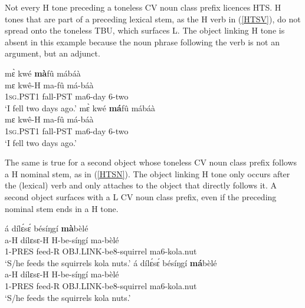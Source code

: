 Not every H tone preceding a toneless CV noun class prefix licences HTS. H tones that are part of a preceding lexical stem, as the H verb in (\ref{HTSV}), do not spread onto the toneless TBU, which surfaces L. The object linking H tone is absent in this example because the noun phrase following the verb is not an argument, but an adjunct.

\begin{exe} 
\ex\label{HTSV}
\begin{xlist}
\ex\label{HTSV1}
  \glll    mɛ̀ kwé {\bfseries mà}fû mábáà  \\
	    mɛ kwê-H ma-fû má-báà \\ 
              1\textsc{sg}.PST1 fall-PST ma6-day 6-two  \\
    \trans `I fell two days ago.'
\ex\label{HTSV2}
  \glll    *mɛ̀ kwé {\bfseries má}fû mábáà  \\
	    mɛ kwê-H ma-fû má-báà \\ 
              1\textsc{sg}.PST1 fall-PST ma6-day 6-two  \\
    \trans `I fell two days ago.'
\end{xlist}
\end{exe}

The same is true for a second object whose toneless CV noun class prefix follows a H nominal stem, as in (\ref{HTSN}). The object linking H tone only occurs after the (lexical) verb and only attaches to the object that directly follows it. A second object surfaces with a L CV noun class prefix, even if the preceding nominal stem ends in a H tone.


\begin{exe} 
\ex\label{HTSN}
\begin{xlist}
\ex\label{HTSN1}
  \glll    á dílɛ́sɛ́ bésíŋgí {\bfseries mà}bèlé  \\
	    a-H dílɛsɛ-H H-be-síŋgí ma-bèlé \\ 
             1-PRES feed-R OBJ.LINK-be8-squirrel ma6-kola.nut  \\
    \trans `S/he feeds the squirrels kola nuts.'
\ex\label{HTSN2}
  \glll    *á dílɛ́sɛ́ bésíŋgí {\bfseries má}bèlé  \\
	    a-H dílɛsɛ-H H-be-síŋgí ma-bèlé \\ 
             1-PRES feed-R OBJ.LINK-be8-squirrel ma6-kola.nut  \\
    \trans `S/he feeds the squirrels kola nuts.'
\end{xlist}
\end{exe}



